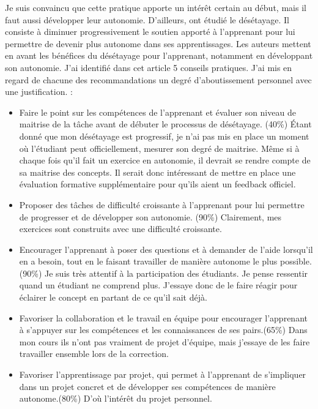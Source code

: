 Je suis convaincu que cette pratique apporte un intérêt certain au début, mais il faut aussi développer leur autonomie. D'ailleurs, \citet{auger2010desetayage} ont étudié le désétayage. Il consiste à diminuer progressivement le soutien apporté à l'apprenant pour lui permettre de devenir plus autonome dans ses apprentissages. Les auteurs mettent en avant les bénéfices du désétayage pour l'apprenant, notamment en développant son autonomie. J'ai identifié dans cet article 5 conseils pratiques. J'ai mis en regard de chacune des recommandations un degré d'aboutissement personnel avec une justification. :

\begin{itemize}
    \item Faire le point sur les compétences de l'apprenant et évaluer son niveau de maitrise de la tâche avant de débuter le processus de désétayage. (40\%) Étant donné que mon désétayage est progressif, je n'ai pas mis en place un moment où l'étudiant peut officiellement, mesurer son degré de maitrise. Même si à chaque fois qu'il fait un exercice en autonomie, il devrait se rendre compte de sa maitrise des concepts. Il serait donc intéressant de mettre en place une évaluation formative supplémentaire pour qu'ils aient un feedback officiel.
    \item Proposer des tâches de difficulté croissante à l'apprenant pour lui permettre de progresser et de développer son autonomie. (90\%) Clairement, mes exercices sont construits avec une difficulté croissante.
    \item Encourager l'apprenant à poser des questions et à demander de l'aide lorsqu'il en a besoin, tout en le faisant travailler de manière autonome le plus possible.(90\%) Je suis très attentif à la participation des étudiants. Je pense ressentir quand un étudiant ne comprend plus. J'essaye donc de le faire réagir pour éclairer le concept en partant de ce qu'il sait déjà.
    \item Favoriser la collaboration et le travail en équipe pour encourager l'apprenant à s'appuyer sur les compétences et les connaissances de ses pairs.(65\%) Dans mon cours ils n'ont pas vraiment de projet d'équipe, mais j'essaye de les faire travailler ensemble lors de la correction.
    \item Favoriser l'apprentissage par projet, qui permet à l'apprenant de s'impliquer dans un projet concret et de développer ses compétences de manière autonome.(80\%) D'où l'intérêt du projet personnel.
\end{itemize}

